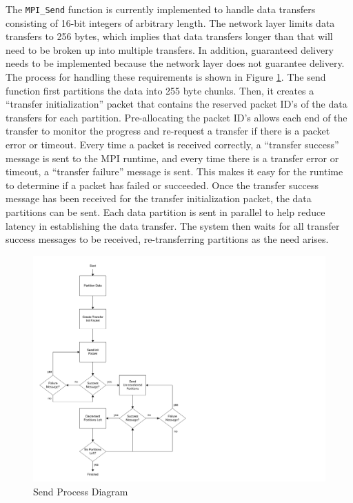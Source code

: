 The \lstinline$MPI_Send$ function is currently implemented to handle data transfers consisting of 16-bit integers of arbitrary length. The network layer limits data transfers to 256 bytes, which implies that data transfers longer than that will need to be broken up into multiple transfers. In addition, guaranteed delivery needs to be implemented because the network layer does not guarantee delivery. The process for handling these requirements is shown in Figure \ref{fig:api:send_process_diagram}. The send function first partitions the data into 255 byte chunks. Then, it creates a ``transfer initialization'' packet that contains the reserved packet ID's of the data transfers for each partition. Pre-allocating the packet ID's allows each end of the transfer to monitor the progress and re-request a transfer if there is a packet error or timeout. Every time a packet is received correctly, a ``transfer success'' message is sent to the MPI runtime, and every time there is a transfer error or timeout, a ``transfer failure'' message is sent. This makes it easy for the runtime to determine if a packet has failed or succeeded. Once the transfer success message has been received for the transfer initialization packet, the data partitions can be sent. Each data partition is sent in parallel to help reduce latency in establishing the data transfer. The system then waits for all transfer success messages to be received, re-transferring partitions as the need arises.

\begin{figure}[ptb]
	\begin{centering}
		\includegraphics{API/Figures/api-send_process_diagram.pdf}
		\caption{Send Process Diagram}
		\label{fig:api:send_process_diagram}
	\end{centering}
\end{figure}

